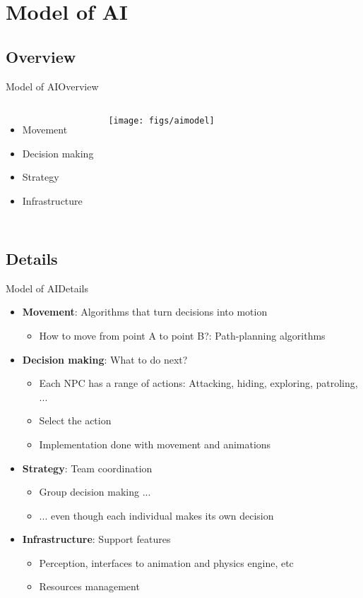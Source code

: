\documentclass[10pt,compress]{beamer} %
\begin{document}
\section{Model of AI}
\subsection{Overview}
\begin{frame}{Model of AI}{Overview}
    \begin{columns}
		\begin{itemize}
		\item Movement
		\item Decision making
		\item Strategy
		\item Infrastructure
		\end{itemize}
		\centering\texttt{[image: figs/aimodel]}\\

	\end{columns}
\end{frame}

\subsection{Details}
\begin{frame}{Model of AI}{Details}
	\begin{itemize}
	\item \textbf{Movement}: Algorithms that turn decisions into motion
	\begin{itemize}
		\item How to move from point A to point B?: Path-planning algorithms
	\end{itemize}
	\item \textbf{Decision making}: What to do next?
	\begin{itemize}
		\item Each NPC has a range of actions: Attacking, hiding, exploring, patroling, ...
		\item Select the action
		\item Implementation done with movement and animations
	\end{itemize}
	\item \textbf{Strategy}: Team coordination
	\begin{itemize}
		\item Group decision making ...
		\item ... even though each individual makes its own decision
	\end{itemize}
	\item \textbf{Infrastructure}: Support features
	\begin{itemize}
		\item Perception, interfaces to animation and physics engine, etc
		\item Resources management
	\end{itemize}
	\end{itemize}
\end{frame}
\end{document}
